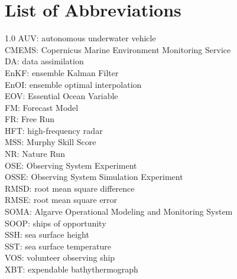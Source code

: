 \documentclass{auxfiles/ualgphdcls}
\begin{document}
\tableofcontents
\newpage
\listoffigures
\newpage

\chapter*{List of Abbreviations}
\begin{spacing}{1.0}
{
\setlength{\parskip}{0pt}
\setlength{\parindent}{0pt}
AUV: autonomous underwater vehicle\\
CMEMS: Copernicus Marine Environment Monitoring Service\\
DA: data assimilation\\
EnKF: ensemble Kalman Filter\\
EnOI: ensemble optimal interpolation\\
EOV: Essential Ocean Variable\\
FM: Forecast Model\\
FR: Free Run\\
HFT: high-frequency radar\\
MSS: Murphy Skill Score\\
NR: Nature Run\\
OSE: Observing System Experiment\\
OSSE: Observing System Simulation Experiment\\
RMSD: root mean square difference\\
RMSE: root mean square error\\
SOMA: Algarve Operational Modeling and Monitoring System\\
SOOP: ships of opportunity\\
SSH: sea surface height\\
SST: sea surface temperature\\
VOS: volunteer observing ship\\
XBT: expendable bathythermograph
}
\end{spacing}
\newpage

\mainmatter






\singlespacing
\printbibliography[heading=bibintoc]	
\end{document}
